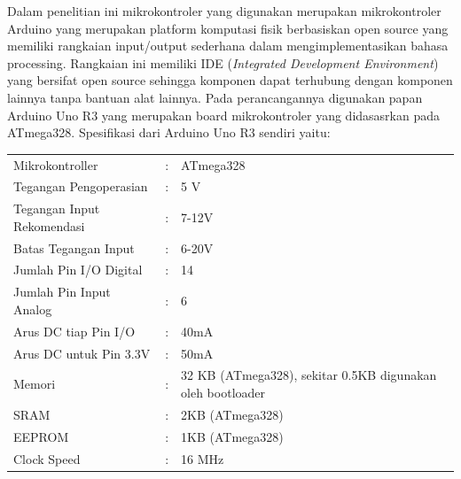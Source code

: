 Dalam penelitian ini mikrokontroler yang digunakan merupakan mikrokontroler Arduino yang merupakan
platform komputasi fisik berbasiskan open source yang memiliki rangkaian input/output sederhana
dalam mengimplementasikan bahasa processing. Rangkaian ini memiliki IDE (\textit{Integrated 
Development Environment}) yang bersifat open source sehingga komponen dapat terhubung dengan
komponen lainnya tanpa bantuan alat lainnya. Pada perancangannya digunakan papan Arduino Uno R3
yang merupakan board mikrokontroler yang didasasrkan pada ATmega328\cite{Sokop2016}. Spesifikasi
dari Arduino Uno R3 sendiri yaitu:
\begin{longtable}{p{6cm}p{3pt}p{6cm}}
    \hspace{20pt} Mikrokontroller &:& ATmega328\\
    \hspace{20pt} Tegangan Pengoperasian &:&5 V\\
    \hspace{20pt} Tegangan Input Rekomendasi &:& 7-12V\\
    \hspace{20pt} Batas Tegangan Input &:& 6-20V\\
    \hspace{20pt} Jumlah Pin I/O Digital &:& 14\\
    \hspace{20pt} Jumlah Pin Input Analog &:& 6\\
    \hspace{20pt} Arus DC tiap Pin I/O &:& 40mA\\
    \hspace{20pt} Arus DC untuk Pin 3.3V &:& 50mA\\
    \hspace{20pt} Memori &:& 32 KB (ATmega328), sekitar 0.5KB digunakan oleh bootloader\\
    \hspace{20pt} SRAM &:& 2KB (ATmega328)\\
    \hspace{20pt} EEPROM &:& 1KB (ATmega328)\\
    \hspace{20pt} Clock Speed &:& 16 MHz
\end{longtable}
